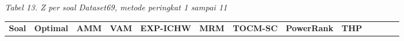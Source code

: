 \documentclass[10pt,a4paper]{article}
\newcounter{none}
\begin{document}
\emph{Tabel 13. Z per soal Dataset69, metode peringkat 1 sampai 11}

{\def\LTcaptype{none} %
\begin{longtable}[]{@{}
  >{\raggedright\arraybackslash}p{}
  >{\raggedright\arraybackslash}p{}
  >{\raggedright\arraybackslash}p{}
  >{\raggedright\arraybackslash}p{}
  >{\raggedright\arraybackslash}p{}
  >{\raggedright\arraybackslash}p{}
  >{\raggedright\arraybackslash}p{}
  >{\raggedright\arraybackslash}p{}
  >{\raggedright\arraybackslash}p{}
  >{\raggedright\arraybackslash}p{}
  >{\raggedright\arraybackslash}p{}
  >{\raggedright\arraybackslash}p{}
  >{\raggedright\arraybackslash}p{}@{}}
\toprule\noalign{}
\begin{minipage}[b]{\linewidth}\raggedright
\textbf{Soal}
\end{minipage} & \begin{minipage}[b]{\linewidth}\centering
\textbf{Optimal}
\end{minipage} & \begin{minipage}[b]{\linewidth}\centering
\textbf{AMM}
\end{minipage} & \begin{minipage}[b]{\linewidth}\centering
\textbf{VAM}
\end{minipage} & \begin{minipage}[b]{\linewidth}\centering
\textbf{EXP-ICHW}
\end{minipage} & \begin{minipage}[b]{\linewidth}\centering
\textbf{MRM}
\end{minipage} & \begin{minipage}[b]{\linewidth}\centering
\textbf{TOCM-SC}
\end{minipage} & \begin{minipage}[b]{\linewidth}\centering
\textbf{PowerRank}
\end{minipage} & \begin{minipage}[b]{\linewidth}\centering
\textbf{THP}

\end{minipage}
\end{longtable}}
\end{document}

